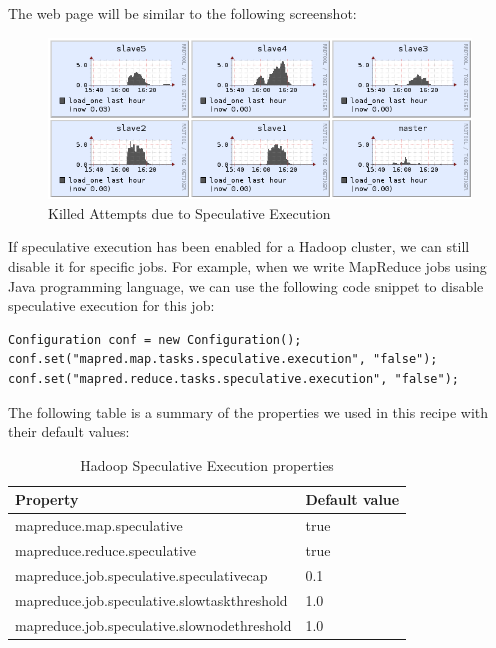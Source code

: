 The web page will be similar to the following screenshot:
\begin{figure}[ht]
  \centering
  \includegraphics[width=.8\textwidth]{figs/5163os_06_10.png}
  \caption{Killed Attempts due to Speculative Execution}\label{fig:killed.jobs.speculative}
\end{figure} 
If speculative execution has been enabled for a Hadoop cluster, we can still disable it for specific jobs. For example, when we write MapReduce jobs using Java programming language, we can use the following code snippet to disable speculative execution for this job:
\lstset{style=bashstyle}
\begin{lstlisting}
Configuration conf = new Configuration();
conf.set("mapred.map.tasks.speculative.execution", "false");
conf.set("mapred.reduce.tasks.speculative.execution", "false");
\end{lstlisting}

The following table is a summary of the properties we used in this recipe with their default values:
\begin{table}[ht]
  \centering
  \begin{tabular}{ll}
    \toprule
    \textbf{Property} & \textbf{Default value} \\ \midrule
      mapreduce.map.speculative & true \\
      mapreduce.reduce.speculative & true \\
      mapreduce.job.speculative.speculativecap & 0.1 \\
      mapreduce.job.speculative.slowtaskthreshold & 1.0 \\
      mapreduce.job.speculative.slownodethreshold & 1.0 \\ \bottomrule
  \end{tabular}
  \caption{Hadoop Speculative Execution properties}\label{tbl:speculative}
\end{table}

